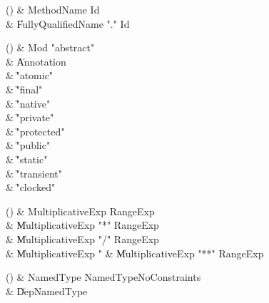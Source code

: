\begin{bbgrammarappendix}

() & MethodName \label{prod:MethodName}  \: Id  \\

 &    \| FullyQualifiedName \xcd"." Id \\

\end{bbgrammarappendix}

\begin{bbgrammarappendix}

() & Mod \label{prod:Mod}  \: \xcd"abstract"  \\

 &    \| Annotation \\
 &    \| \xcd"atomic" \\
 &    \| \xcd"final" \\
 &    \| \xcd"native" \\
 &    \| \xcd"private" \\
 &    \| \xcd"protected" \\
 &    \| \xcd"public" \\
 &    \| \xcd"static" \\
 &    \| \xcd"transient" \\
 &    \| \xcd"clocked" \\

\end{bbgrammarappendix}

\begin{bbgrammarappendix}

() & MultiplicativeExp \label{prod:MultiplicativeExp}  \: RangeExp  \\

 &    \| MultiplicativeExp \xcd"*" RangeExp \\
 &    \| MultiplicativeExp \xcd"/" RangeExp \\
 &    \| MultiplicativeExp \xcd"%
 &    \| MultiplicativeExp \xcd"**" RangeExp \\

\end{bbgrammarappendix}

\begin{bbgrammarappendix}

() & NamedType \label{prod:NamedType}  \: NamedTypeNoConstraints  \\

 &    \| DepNamedType \\

\end{bbgrammarappendix}


